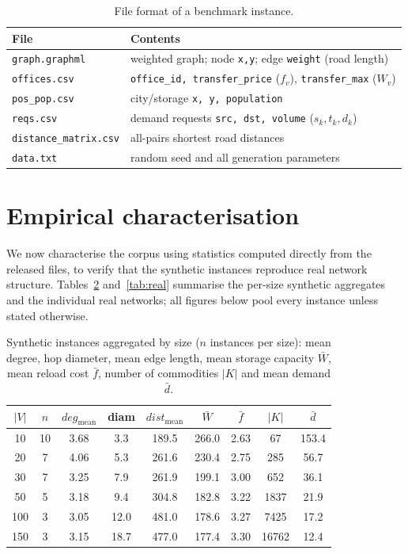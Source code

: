 \documentclass[11pt]{article}
\begin{document}
\begin{table}[t]
\centering
\caption{File format of a benchmark instance.}
\label{tab:format}
\small
\begin{tabular}{ll}
\toprule
File & Contents\\
\midrule
\texttt{graph.graphml}        & weighted graph; node \texttt{x,y}; edge \texttt{weight} (road length)\\
\texttt{offices.csv}          & \texttt{office\_id, transfer\_price} ($f_v$), \texttt{transfer\_max} ($W_v$)\\
\texttt{pos\_pop.csv}         & city/storage \texttt{x, y, population}\\
\texttt{reqs.csv}             & demand requests \texttt{src, dst, volume} ($s_k,t_k,d_k$)\\
\texttt{distance\_matrix.csv} & all-pairs shortest road distances\\
\texttt{data.txt}             & random seed and all generation parameters\\
\bottomrule
\end{tabular}
\end{table}

\section{Empirical characterisation}
\label{sec:char}

We now characterise the corpus using statistics computed directly from the
released files, to verify that the synthetic instances reproduce real network
structure. Tables~\ref{tab:syn} and~\ref{tab:real} summarise the per-size
synthetic aggregates and the individual real networks; all figures below pool
every instance unless stated otherwise.

\begin{table}[t]
\centering
\caption{Synthetic instances aggregated by size ($n$ instances per size):
mean degree, hop diameter, mean edge length, mean storage capacity $\bar W$,
mean reload cost $\bar f$, number of commodities $|K|$ and mean demand
$\bar d$.}
\label{tab:syn}
\small
\begin{tabular}{ccccccccc}
\toprule
$|V|$ & $n$ & $deg_{\text{mean}}$ & diam & $dist_{\text{mean}}$ & $\bar W$ & $\bar f$ & $|K|$ & $\bar d$\\
\midrule
10  & 10 & 3.68 & 3.3  & 189.5 & 266.0 & 2.63 & 67    & 153.4\\
20  & 7  & 4.06 & 5.3  & 261.6 & 230.4 & 2.75 & 285   & 56.7\\
30  & 7  & 3.25 & 7.9  & 261.9 & 199.1 & 3.00 & 652   & 36.1\\
50  & 5  & 3.18 & 9.4  & 304.8 & 182.8 & 3.22 & 1837  & 21.9\\
100 & 3  & 3.05 & 12.0 & 481.0 & 178.6 & 3.27 & 7425  & 17.2\\
150 & 3  & 3.15 & 18.7 & 477.0 & 177.4 & 3.30 & 16762 & 12.4\\
\bottomrule
\end{tabular}
\end{table}
\end{document}

